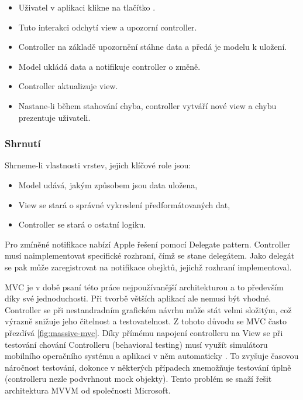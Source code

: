 \begin{itemize}
  \item Uživatel v aplikaci klikne na tlačítko .
  \item Tuto interakci odchytí view a upozorní controller.
  \item Controller na základě upozornění stáhne data a předá je modelu k uložení.
  \item Model ukládá data a notifikuje controller o změně.
  \item Controller aktualizuje view.
  \item Nastane-li během stahování chyba, controller vytváří nové view a chybu prezentuje uživateli.
\end{itemize}


\subsubsection{Shrnutí}

Shrneme-li vlastnosti vrstev, jejich klíčové role jsou:

\begin{itemize}
  \item Model udává, jakým způsobem jsou data uložena,
  \item View se stará o správné vykreslení předformátovaných dat,
  \item Controller se stará o ostatní logiku.
\end{itemize}


Pro zmíněné notifikace nabízí Apple řešení pomocí Delegate pattern.
Controller musí naimplementovat specifické rozhraní, čímž se stane delegátem.
Jako delegát se pak může zaregistrovat na notifikace obejktů, jejichž rozhraní implementoval.

MVC je v době psaní této práce nejpoužívanější architekturou a to především díky své jednoduchosti.
Při tvorbě větších aplikací ale nemusí být vhodné.
Controller se při nestandradním grafickém návrhu může stát velmi složitým, což výrazně snižuje jeho čitelnost a testovatelnost.
Z tohoto důvodu se MVC často přezdívá  \ref{fig:massive-mvc}.
Díky přímému napojení controlleru na View se při testování chování Controlleru (behavioral testing) musí využít simulátoru mobilního operačního systému a aplikaci v něm automaticky .
To zvyšuje časovou náročnost testování, dokonce v některých případech znemožňuje testování úplně (controlleru nezle podvrhnout mock objekty).
Tento problém se snaží řešit architektura MVVM od společnosti Microsoft.

